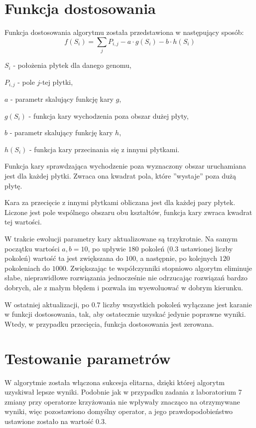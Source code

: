 \documentclass[11pt]{article}
\begin{document}
\section{Funkcja dostosowania}
Funkcja dostosowania algorytmu została przedstawiona w następujący sposób:
\begin{equation}
f(S_i) = \sum_j P_{i, j} - a \cdot g(S_i) - b \cdot  h(S_i)
\end{equation}
\begin{description}
\item $S_i$ - położenia płytek dla danego genomu,
\item $P_{i, j}$ - pole $j$-tej płytki,
\item $a$ - parametr skalujący funkcję kary $g$,
\item $g(S_i)$ - funkcja kary wychodzenia poza obszar dużej płyty,
\item $b$ - parametr skalujący funkcję kary $h$,
\item $h(S_i)$ - funkcja kary przecinania się z innymi płytkami.
\end{description}

Funkcja kary sprawdzająca wychodzenie poza wyznaczony obszar uruchamiana jest dla każdej płytki. Zwraca ona kwadrat pola, które ''wystaje'' poza dużą płytę.

Kara za przecięcie z innymi płytkami obliczana jest dla każdej pary płytek. Liczone jest pole wspólnego obszaru obu kształtów, funkcja kary zwraca kwadrat tej wartości.

W trakcie ewolucji parametry kary aktualizowane są trzykrotnie. Na samym początku wartości $a, b = 10$, po upływie $180$ pokoleń ($0.3$ ustawionej liczby pokoleń) wartość ta jest zwiększana do $100$, a następnie, po kolejnych $120$ pokoleniach do $1000$. Zwiększając te współczynniki stopniowo algorytm eliminuje słabe, nieprawidłowe rozwiązania jednocześnie nie odrzucając rozwiązań bardzo dobrych, ale z małym błędem i pozwala im wyewoluować w dobrym kierunku. 

W ostatniej aktualizacji, po $0.7$ liczby wszystkich pokoleń wyłączane jest karanie w funkcji dostosowania, tak, aby ostatecznie uzyskać jedynie poprawne wyniki. Wtedy, w przypadku przecięcia, funkcja dostosowania jest zerowana.

\section{Testowanie parametrów}
W algorytmie została włączona sukcesja elitarna, dzięki której algorytm uzyskiwał lepsze wyniki. Podobnie jak w przypadku zadania z laboratorium 7 zmiany przy operatorze krzyżowania nie wpływały znacząco na otrzymywane wyniki, więc pozostawiono domyślny operator, a jego prawdopodobieństwo ustawione zostało na wartość $0.3$.
\end{document}
